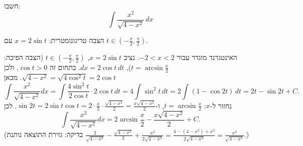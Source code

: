 
\begin{question}
חשבו:
\[ \int\frac{x^2}{\sqrt{4-x^2}}\,dx \]
\end{question}

\begin{hint}
הצבה טריגונומטרית: $x=2\sin t$ עם $t\in(-\frac\pi2,\frac\pi2)$.
\end{hint}

\begin{solution}
האינטגרנד מוגדר עבור $-2<x<2$. נציב $x=2\sin t$, $t\in(-\frac\pi2,\frac\pi2)$ (הצבה הפיכה: $t=\arcsin\frac x2$), $dx=2\cos t\,dt$. בתחום זה $\cos t>0$, ולכן $\sqrt{4-x^2}=\sqrt{4\cos^2t}=2\cos t$. מכאן
\[ \int\frac{x^2}{\sqrt{4-x^2}}dx=\int\frac{4\sin^2t}{2\cos t}\cdot2\cos t\,dt=4\int\sin^2t\,dt=2\int(1-\cos2t)\,dt=2t-\sin2t+C. \]
נחזור ל-$x$: $t=\arcsin\frac x2$, ו-$\sin2t=2\sin t\cos t=2\cdot\frac x2\cdot\frac{\sqrt{4-x^2}}{2}=\frac{x\sqrt{4-x^2}}{2}$. לכן
\[ \boxed{\int\frac{x^2}{\sqrt{4-x^2}}dx=2\arcsin\frac x2-\frac{x\sqrt{4-x^2}}{2}+C.} \]
(בדיקה: גזירת התוצאה נותנת $\frac{2}{\sqrt{4-x^2}}-\frac{\sqrt{4-x^2}}{2}+\frac{x^2}{2\sqrt{4-x^2}}=\frac{4-(4-x^2)+x^2}{2\sqrt{4-x^2}}=\frac{x^2}{\sqrt{4-x^2}}$.)
\end{solution}
